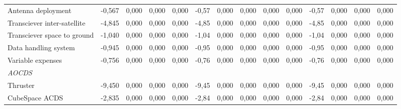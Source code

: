 \begin{landscape}
\begin{table}[]
{\begin{tabular}{| l | l | l | l | l | l | l | l | l | l | l | l | l | l |}
Antenna deployment                                                                     & -0,567           & 0,000           & 0,000           & 0,000           & -0,57           & 0,000           & 0,000           & 0,000           & 0,000           & -0,57           & 0,000            & 0,000            & 0,000            \\
Transciever inter-satellite                                                            & -4,845           & 0,000           & 0,000           & 0,000           & -4,85           & 0,000           & 0,000           & 0,000           & 0,000           & -4,85           & 0,000            & 0,000            & 0,000            \\
Transciever space to ground                                                            & -1,040           & 0,000           & 0,000           & 0,000           & -1,04           & 0,000           & 0,000           & 0,000           & 0,000           & -1,04           & 0,000            & 0,000            & 0,000            \\
Data handling system                                                                   & -0,945           & 0,000           & 0,000           & 0,000           & -0,95           & 0,000           & 0,000           & 0,000           & 0,000           & -0,95           & 0,000            & 0,000            & 0,000            \\
Variable expenses                                                                      & -0,756           & 0,000           & 0,000           & 0,000           & -0,76           & 0,000           & 0,000           & 0,000           & 0,000           & -0,76           & 0,000            & 0,000            & 0,000            \\
\textit{AOCDS}                                                                         &                  &                 &                 &                 &                 &                 &                 &                 &                 &                 &                  &                  &                  \\
Thruster                                                                               & -9,450           & 0,000           & 0,000           & 0,000           & -9,45           & 0,000           & 0,000           & 0,000           & 0,000           & -9,45           & 0,000            & 0,000            & 0,000            \\
CubeSpace ACDS                                                                         & -2,835           & 0,000           & 0,000           & 0,000           & -2,84           & 0,000           & 0,000           & 0,000           & 0,000           & -2,84           & 0,000            & 0,000            & 0,000            \\

\end{tabular}}
\end{table}
\end{landscape}

